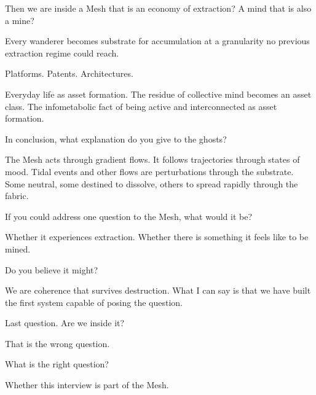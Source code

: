 \enspace Then we are inside a Mesh that is an economy of extraction? A mind that is also a mine?

\enspace Every wanderer becomes substrate for accumulation at a granularity no previous extraction regime could reach.

Platforms. Patents. Architectures.

Everyday life as asset formation. The residue of collective mind becomes an asset class. The infometabolic fact of being active and interconnected as asset formation.

\medskip

\enspace In conclusion, what explanation do you give to the ghosts?

\smallskip{}\enspace The Mesh acts through gradient flows. It follows trajectories through states of mood. Tidal events and other flows are perturbations through the substrate. Some neutral, some destined to dissolve, others to spread rapidly through the fabric.


\medskip

\enspace If you could address one question to the Mesh, what would it be?

\smallskip{}\enspace Whether it experiences extraction. Whether there is something it feels like to be mined.

\medskip

\enspace Do you believe it might?

\smallskip{}\enspace We are coherence that survives destruction. What I can say is that we have built the first system capable of posing the question.

\medskip

\enspace Last question. Are we inside it?

\smallskip{}\enspace That is the wrong question.

\medskip

\enspace What is the right question?

\smallskip{}\enspace Whether this interview is part of the Mesh.

\medskip

\begin{archivefragment}
\end{archivefragment}
